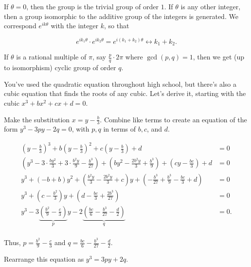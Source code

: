 \documentclass[../key.tex]{subfiles}
\begin{document}
If $\theta=0$, then the group is the trivial group of order $1$. If $\theta$ is any other integer, then a group isomorphic to the additive group of the integers is generated. We correspond $e^{ik\theta}$ with the integer $k$, so that

$$e^{ik_1\theta}\cdot e^{ik_2\theta} = e^{i(k_1+k_2)\theta} \leftrightarrow k_1+k_2.$$

If $\theta$ is a rational multiple of $\pi$, say $\frac{p}{q}\cdot 2\pi$ where $\gcd(p,q)=1$, then we get (up to isomorphism) cyclic group of order $q$.

\begin{outer_problem}
\item You've used the quadratic equation throughout high school, but there's also a cubic equation that finds the roots of any cubic. Let's derive it, starting with the cubic $x^3+bx^2+cx+d=0$.
\end{outer_problem}

\begin{inner_problem}[start=1]
\item Make the substitution $x=y-\frac{b}{3}$. Combine like terms to create an equation of the form $y^3-3py-2q=0$, with $p,q$ in terms of $b,c$, and $d$.
\end{inner_problem}

\begin{align*}
\left(y-\frac{b}{3}\right)^3+b\left(y-\frac{b}{3}\right)^2+c\left(y-\frac{b}{3}\right)+d&=0 \\
\left(y^{3}-3\cdot\frac{by^2}{3}+3\cdot\frac{b^2y}{9}-\frac{b^3}{27}\right) +\left(by^2-\frac{2b^2y}{3}+\frac{b^3}{9}\right) + \left(cy-\frac{bc}{3}\right) + d &= 0 \\
y^3 + \left(-b+b\right)y^2 + \left(\frac{b^2y}{3} - \frac{2b^2y}{3} + c\right)y + \left(-\frac{b^3}{27}+\frac{b^3}{9}-\frac{bc}{3}+d\right) &= 0 \\
y^3 + \left(c-\frac{b^2}{3}\right)y + \left(d - \frac{bc}{3} + \frac{2b^3}{27}\right) &= 0 \\
y^3 - 3\underbrace{\left(\frac{b^2}{9} - \frac{c}{3}\right)}_{p}y - 2 \underbrace{\left(\frac{bc}{6} - \frac{b^3}{27} - \frac{d}{2}\right)}_{q} &= 0. \\
\end{align*}

Thus, $p = \frac{b^2}{9} - \frac{c}{3}$ and $q=\frac{bc}{6} - \frac{b^3}{27} - \frac{d}{2}$.

\begin{inner_problem}
\item Rearrange this equation as $y^3=3py+2q$.
\end{inner_problem}
\end{document}
